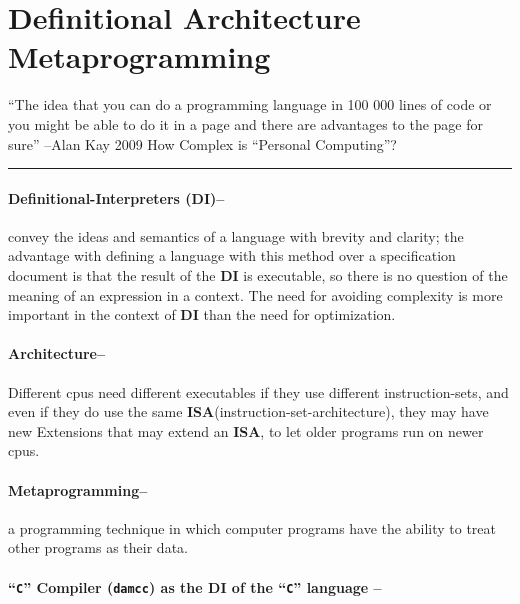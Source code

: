 \hypertarget{definitional-architecture-metaprogramming}{%
\section{Definitional Architecture
Metaprogramming}\label{definitional-architecture-metaprogramming}}

``The idea that you can do a programming language in 100 000 lines of
code or you might be able to do it in a page and there are advantages to
the page for sure'' --Alan Kay 2009 How Complex is ``Personal
Computing''?

\begin{center}\rule{0.5\linewidth}{0.5pt}\end{center}

\hypertarget{definitional-interpreters-di}{%
\paragraph{Definitional-Interpreters
(DI)--}\label{definitional-interpreters-di}}

convey the ideas and semantics of a language with brevity and clarity;
the advantage with defining a language with this method over a
specification document is that the result of the \textbf{DI} is
executable, so there is no question of the meaning of an expression in a
context. The need for avoiding complexity is more important in the
context of \textbf{DI} than the need for optimization.

\hypertarget{architecture}{%
\paragraph{Architecture--}\label{architecture}}

Different cpus need different executables if they use different
instruction-sets, and even if they do use the same
\textbf{ISA}(instruction-set-architecture), they may have new Extensions
that may extend an \textbf{ISA}, to let older programs run on newer
cpus.

\hypertarget{metaprogramming}{%
\paragraph{Metaprogramming--}\label{metaprogramming}}

a programming technique in which computer programs have the ability to
treat other programs as their data.

\hypertarget{c-compiler-damcc-as-the-di-of-the-c-language}{%
\paragraph{\texorpdfstring{``\texttt{C}'' Compiler (\texttt{damcc}) as
the DI of the ``\texttt{C}'' language
--}{``C'' Compiler (damcc) as the DI of the ``C'' language --}}\label{c-compiler-damcc-as-the-di-of-the-c-language}}

